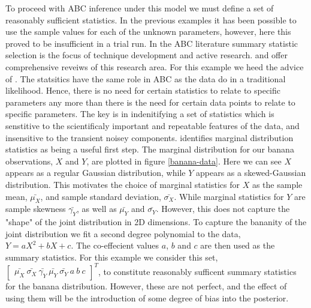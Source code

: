 To proceed with ABC inference under this model we must define a set of reasonably sufficient statistics. In the previous examples it has been possible to use the sample values for each of the unknown parameters, however, here this proved to be insufficient in a trial run. In the ABC literature summary statistic selection is the focus of technique development and active research. \citet{Blum2013} and \citet{Prangle2017} offer comprehensive reveiws of this research area. For this example we heed the advice of \citet{Wood2010}. The statsitics have the same role in ABC as the data do in a traditional likelihood. Hence, there is no need for certain statistics to relate to specific parameters any more than there is the need for certain data points to relate to specific parameters. The key is in indenitifying a set of statistics which is senstitive to the scientificaly important and repeatable features of the data, and insensitive to the transient noisey components. \citet{Wood2010} identifies marginal distribution statistics as being a useful first step. The marginal distribution for our banana observations, $X$ and $Y$, are plotted in figure \ref{banana-data}. Here we can see $X$ appears as a regular Gaussian distribution, while $Y$ appears as a skewed-Gaussian distribution. This motivates the choice of marginal statistics for $X$ as the sample mean, $\bar{\mu_X}$, and sample standard deviation, $\bar{\sigma_X}$. While marginal statistics for $Y$ are sample skewness $\bar{\gamma_Y}$, as well as $\bar{\mu_Y}$ and $\bar{\sigma_Y}$. However, this does not capture the "shape" of the joint distribution in 2D dimensions. To capture the bananity of the joint distribution we fit a second degree polynomial to the data, $Y = aX^2 + bX + c$. The co-effecient values $a$, $b$ and $c$ are then used as the summary statistics. For this example we consider this set, $\begin{bmatrix}
\bar{\mu_X}\ \bar{\sigma_X}\ \bar{\gamma_Y}\ \bar{\mu_Y}\ \bar{\sigma_Y}\ a\ b\ c
\end{bmatrix}^T$, to constitute reasonably sufficent summary statistics for the banana distribution. However, these are not perfect, and the effect of using them will be the introduction of some degree of bias into the posterior. \\



